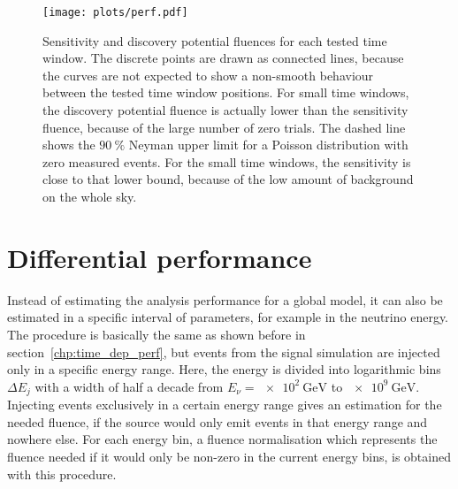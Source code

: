 \begin{figure}[htbp]
  \centering
  \texttt{[image: plots/perf.pdf]}
  \caption[Performance fluences for each time window]{
    Sensitivity and discovery potential fluences for each tested time window.
    The discrete points are drawn as connected lines, because the curves are not expected to show a non-smooth behaviour between the tested time window positions.
    For small time windows, the discovery potential fluence is actually lower than the sensitivity fluence, because of the large number of zero trials.
    The dashed line shows the $\SI{90}{\percent}$ Neyman upper limit for a Poisson distribution with zero measured events.
    For the small time windows, the sensitivity is close to that lower bound, because of the low amount of background on the whole sky.
  }
  \label{fig:tdep_perf}
\end{figure}


\section{Differential performance}
  \label{chp:tdep_diff_perf}
Instead of estimating the analysis performance for a global model, it can also be estimated in a specific interval of parameters, for example in the neutrino energy.
The procedure is basically the same as shown before in section~\ref{chp:time_dep_perf}, but events from the signal simulation are injected only in a specific energy range.
Here, the energy is divided into logarithmic bins $\Delta E_j$ with a width of half a decade from $E_\nu = \SI{e2}{\GeV}$ to $\SI{e9}{\GeV}$.
Injecting events exclusively in a certain energy range gives an estimation for the needed fluence, if the source would only emit events in that energy range and nowhere else.
For each energy bin, a fluence normalisation which represents the fluence needed if it would only be non-zero in the current energy bins, is obtained with this procedure.

